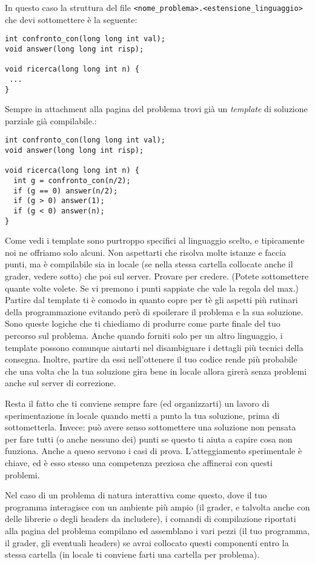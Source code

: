 \documentclass[a4paper,11pt]{article}
\begin{document}
    In questo caso la struttura del file \texttt{<nome\_problema>.<estensione\_linguaggio>} che devi sottomettere \`e la seguente:

\begin{verbatim}
int confronto_con(long long int val);
void answer(long long int risp);

void ricerca(long long int n) {
 ...
}
\end{verbatim}
  
Sempre in attachment alla pagina del problema trovi già un \emph{template} di soluzione parziale già compilabile.:

\begin{verbatim}
int confronto_con(long long int val);
void answer(long long int risp);

void ricerca(long long int n) {
  int g = confronto_con(n/2);
  if (g == 0) answer(n/2);
  if (g > 0) answer(1);
  if (g < 0) answer(n);
}
\end{verbatim}

Come vedi i template sono purtroppo specifici al linguaggio scelto, e tipicamente noi ne offriamo solo alcuni. Non aspettarti che risolva molte istanze e faccia punti, ma \`e compilabile sia in locale (se nella stessa cartella collocate anche il grader, vedere sotto) che poi sul server. Provare per credere. (Potete sottomettere quante volte volete. Se vi premono i punti sappiate che vale la regola del max.)
Partire dal template ti è comodo in quanto copre per tè gli aspetti più rutinari della programmazione evitando però di spoilerare il problema e la sua soluzione. Sono queste logiche che ti chiediamo di produrre come parte finale del tuo percorso sul problema. Anche quando forniti solo per un altro linguaggio, i template possono comunque aiutarti nel disambiguare i dettagli più tecnici della consegna. Inoltre, partire da essi nell'ottenere il tuo codice rende più probabile che una volta che la tua soluzione gira bene in locale allora girerà senza problemi anche sul server di correzione.

Resta il fatto che ti conviene sempre fare (ed organizzarti) un lavoro di sperimentazione in locale quando metti a punto la tua soluzione, prima di sottometterla. Invece: può avere senso sottomettere una soluzione non pensata per fare tutti (o anche nessuno dei) punti se questo ti aiuta a capire cosa non funziona. Anche a queso servono i casi di prova. L'atteggiamento sperimentale è chiave, ed è esso stesso una competenza preziosa che affinerai con questi problemi. 

  Nel caso di un problema di natura interattiva come questo, dove il tuo programma interagisce
  con un ambiente pi\`u ampio (il grader, e talvolta anche con delle librerie o degli headers da includere), i comandi di compilazione riportati alla pagina del problema compilano ed assemblano i vari pezzi (il tuo programma, il grader, gli eventuali headers) se avrai collocato questi componenti entro la stessa cartella (in locale ti conviene farti una cartella per problema).
  
\end{document}
